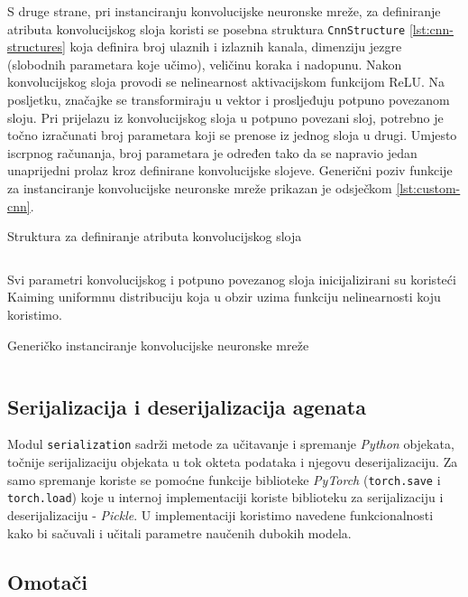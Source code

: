 S druge strane, pri instanciranju konvolucijske neuronske mreže, za definiranje atributa konvolucijskog sloja koristi se posebna struktura \texttt{CnnStructure} \ref{lst:cnn-structures} koja definira broj ulaznih i izlaznih kanala, dimenziju jezgre (slobodnih parametara koje učimo), veličinu koraka i nadopunu. Nakon konvolucijskog sloja provodi se nelinearnost aktivacijskom funkcijom ReLU. Na posljetku, značajke se transformiraju u vektor i prosljeđuju potpuno povezanom sloju. Pri prijelazu iz konvolucijskog sloja u potpuno povezani sloj, potrebno je točno izračunati broj parametara koji se prenose iz jednog sloja u drugi. Umjesto iscrpnog računanja, broj parametara je određen tako da se napravio jedan unaprijedni prolaz kroz definirane konvolucijske slojeve. Generični poziv funkcije za instanciranje konvolucijske neuronske mreže prikazan je odsječkom \ref{lst:custom-cnn}. 

\begin{listing}[H]
    \caption{Struktura za definiranje atributa konvolucijskog sloja}
    \inputminted{python}{snippets/structures.py}
    \label{lst:cnn-structures}
\end{listing}

Svi parametri konvolucijskog i potpuno povezanog sloja inicijalizirani su koristeći Kaiming uniformnu distribuciju koja u obzir uzima funkciju nelinearnosti koju koristimo.

\begin{listing}[H]
    \caption{Generičko instanciranje konvolucijske neuronske mreže}
    \inputminted{python}{snippets/custom-cnn.py}
    \label{lst:custom-cnn}
\end{listing}

\subsection{Serijalizacija i deserijalizacija agenata}

Modul \texttt{serialization} sadrži metode za učitavanje i spremanje \textit{Python} objekata, točnije serijalizaciju objekata u tok okteta podataka  i njegovu deserijalizaciju. Za samo spremanje koriste se pomoćne funkcije biblioteke \textit{PyTorch} (\texttt{torch.save} i \texttt{torch.load}) koje u internoj implementaciji koriste biblioteku za serijalizaciju i deserijalizaciju - \textit{Pickle}. U implementaciji koristimo navedene funkcionalnosti kako bi sačuvali i učitali parametre naučenih dubokih modela. 

\subsection{Omotači}

